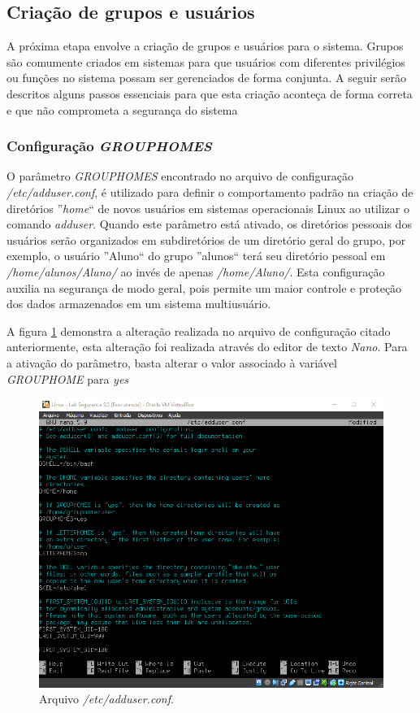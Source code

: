 \documentclass[
	12pt,				%
	oneside,   	        %
	a4paper,			%
	english,			%
	french,				%
	spanish,			%
	brazil,				%
	]{pacotes/abntex2}
\begin{document}
\subsection{Criação de grupos e usuários}
\label{subsec:grupos_usuarios}

A próxima etapa envolve a criação de grupos e usuários para o sistema. Grupos são comumente criados em sistemas para que usuários com diferentes privilégios ou funções no sistema possam ser gerenciados de forma conjunta. A seguir serão descritos alguns passos essenciais para que esta criação aconteça de forma correta e que não comprometa a segurança do sistema

\subsubsection{Configuração \textit{GROUPHOMES}}
O parâmetro \textit{GROUPHOMES} encontrado no arquivo de configuração \textit{/etc/adduser.conf}, é utilizado para definir o comportamento padrão na criação de diretórios ''\textit{home}`` de novos usuários em sistemas operacionais Linux ao utilizar o comando \textit{adduser}. Quando este parâmetro está ativado, os diretórios pessoais dos usuários serão organizados em subdiretórios de um diretório geral do grupo, por exemplo, o usuário ''Aluno`` do grupo ''alunos`` terá seu diretório pessoal em \textit{/home/alunos/Aluno/} ao invés de apenas \textit{/home/Aluno/}. Esta configuração auxilia na segurança de modo geral, pois permite um maior controle e proteção dos dados armazenados em um sistema multiusuário.

A figura \ref{fig:adduser} demonstra a alteração realizada no arquivo de configuração citado anteriormente, esta alteração foi realizada através do editor de texto \textit{Nano}. Para a ativação do parâmetro, basta alterar o valor associado à variável \textit{GROUPHOME} para \textit{yes}

\begin{figure}[H]
  \centering
  \includegraphics[scale=0.7]{figuras/nano_adduser.png}
  \caption{Arquivo \textit{/etc/adduser.conf}.}
  \label{fig:adduser}
\end{figure}
\end{document}
